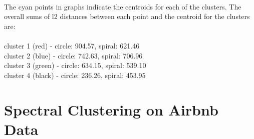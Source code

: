 \documentclass[paper=a4, fontsize=11pt]{scrartcl} %
\numberwithin{equation}{section} %
\numberwithin{figure}{section} %
\numberwithin{table}{section} %
\begin{document}
	\\\\\\
	The cyan points in graphs indicate the centroids for each of the clusters. The overall sums of l2 distances between each point and the centroid for the clusters are:
	\\\\
	cluster 1 (red) - circle: 904.57, spiral: 621.46\\
	cluster 2 (blue) - circle: 742.63, spiral: 706.96\\
	cluster 3 (green) - circle: 634.15, spiral: 539.10\\
	cluster 4 (black) - circle: 236.26, spiral: 453.95
	
	\newpage
	\section{Spectral Clustering on Airbnb Data}
\end{document}
